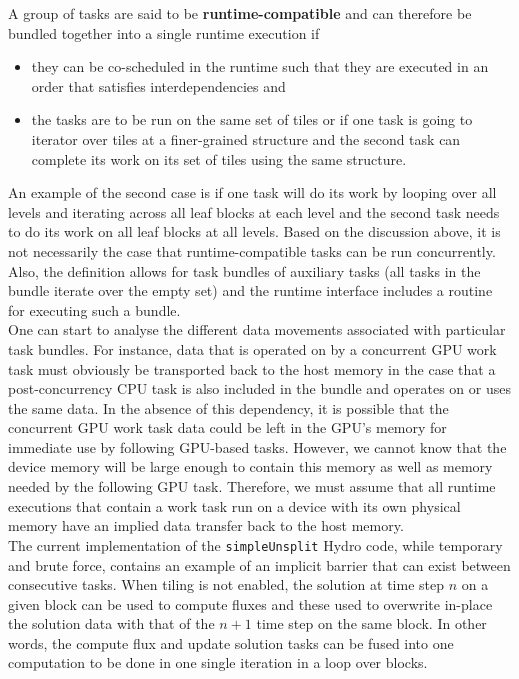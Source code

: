 \documentclass{article}
\begin{document}
A group of tasks are said to be \textbf{runtime-compatible} and can therefore be
bundled together into a single runtime execution if
\begin{itemize}
\item{they can be co-scheduled in the runtime such that they are executed in an
order that satisfies interdependencies and}
\item{the tasks are to be run on the same set of tiles or if one task is going
to iterator over tiles at a finer-grained structure and the second task can
complete its work on its set of tiles using the same structure.}
\end{itemize}
An example of the second case is if one task
will do its work by looping over all levels and iterating across all leaf blocks
at each level and the second task needs to do its work on all leaf blocks at all
levels.  Based on the discussion above, it is not necessarily the case that
runtime-compatible tasks can be run concurrently.  Also, the definition allows
for task bundles of auxiliary tasks (all tasks in the bundle iterate over the
empty set) and the runtime interface includes a routine for executing such a
bundle.\\

One can start to analyse the different data movements associated with particular
task bundles.  For instance, data that is operated on by a concurrent GPU work
task must obviously be transported back to the host memory in the case that a
post-concurrency CPU task is also included in the bundle and operates on or uses
the same data.  In the absence of this dependency, it is possible that the
concurrent GPU work task data could be left in the GPU's memory for immediate
use by following GPU-based tasks.  However, we cannot know that the device
memory will be large enough to contain this memory as well as memory needed by
the following GPU task.  Therefore, we must assume that all runtime executions
that contain a work task run on a device with its own physical memory have an
implied data transfer back to the host memory.\\

The current implementation of the \texttt{simpleUnsplit} Hydro code, while temporary and
brute force, contains an example of an implicit barrier that can exist between
consecutive tasks.  When tiling is not enabled, the solution at time step $n$ on
a given block can be used to compute fluxes and these used to overwrite in-place
the solution data with that of the $n+1$ time step on the same block.  In other
words, the compute flux and update solution tasks can be fused into one
computation to be done in one single iteration in a loop over blocks.\\
\end{document}
